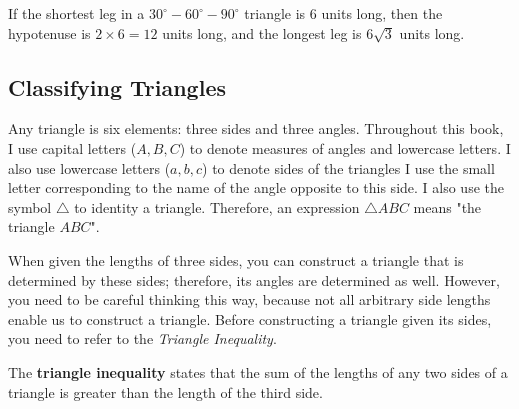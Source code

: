 \begin{example}
  If the shortest leg in a $30^{\circ}-60^{\circ}-90^{\circ}$ triangle is $6$ 
  units long, then the hypotenuse is $2 \times 6 = 12$ units long, and the
  longest leg is $6\sqrt{3}$ units long.
\end{example}


\subsection{Classifying Triangles}
\label{sub_sec:classifying_triangles}

Any triangle is six elements: three sides and three angles. Throughout this
book, I use capital letters ($A, B, C$) to denote measures of angles and
lowercase letters. I also use lowercase letters ($a, b, c$) to denote sides of
the triangles I use the small letter corresponding to the name of the angle
opposite to this side. I also use the symbol $\triangle$ to identity a
triangle. Therefore, an expression $\triangle ABC$ means "the triangle $ABC$".

\begin{figure}[htpb]
  \centering


  \label{fig:generic_triangle}
\end{figure}

When given the lengths of three sides, you can construct a triangle that is
determined by these sides; therefore, its angles are determined as well.
However, you need to be careful thinking this way, because not all arbitrary
side lengths enable us to construct a triangle. Before constructing a triangle
given its sides, you need to refer to the \textit{Triangle Inequality}.

\begin{definition}
  \label{def:triangle_inequality}

  The \textbf{triangle inequality} states that the sum of the lengths of any
  two sides of a triangle is greater than the length of the third side.
\end{definition}


